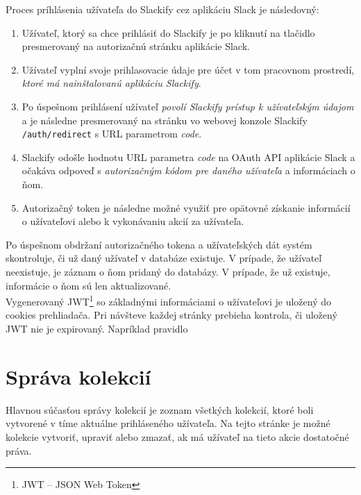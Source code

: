 \noindent Proces príhlásenia užívateľa do Slackify cez aplikáciu Slack je následovný:

\begin{enumerate}
	\item Užívateľ, ktorý sa chce prihlásiť do Slackify je po kliknutí na tlačidlo  presmerovaný na autorizačnú stránku aplikácie Slack.
	\item Užívateľ vyplní svoje prihlasovacie údaje pre účet v tom pracovnom prostredí, \emph{ktoré má nainštalovanú aplikáciu Slackify}.
	\item Po úspešnom prihlásení užívateľ \emph{povolí Slackify prístup k užívateľským údajom} a je následne presmerovaný na stránku vo webovej konzole Slackify \texttt{/auth/redirect} s URL parametrom \textit{code}.
	\item Slackify odošle hodnotu URL parametra \textit{code} na OAuth API aplikácie Slack a očakáva odpoveď s \emph{autorizačným kódom pre daného užívateľa} a informáciach o ňom.
	\item Autorizačný token je následne možné využiť pre opätovné získanie informácií o užívateľovi alebo k vykonávaniu akcií za užívateľa.
\end{enumerate}

\noindent Po úspešnom obdržaní autorizačného tokena a užívateľských dát systém skontroluje, či už daný užívateľ v databáze existuje. V prípade, že užívateľ neexistuje, je záznam o ňom pridaný do databázy. V prípade, že už existuje, informácie o ňom sú len aktualizované. \\

\noindent Vygenerovaný JWT\footnote{JWT -- JSON Web Token} so základnými informáciami o užívateľovi je uložený do cookies prehliadača. Pri návšteve každej stránky prebieha kontrola, či uložený JWT nie je expirovaný. Napríklad pravidlo 

\section{Správa kolekcií}
Hlavnou súčasťou správy kolekcií je zoznam všetkých kolekcií, ktoré boli vytvorené v tíme aktuálne prihláseného užívateľa. Na tejto stránke je možné kolekcie vytvoriť, upraviť alebo zmazať, ak má užívateľ na tieto akcie dostatočné práva.

